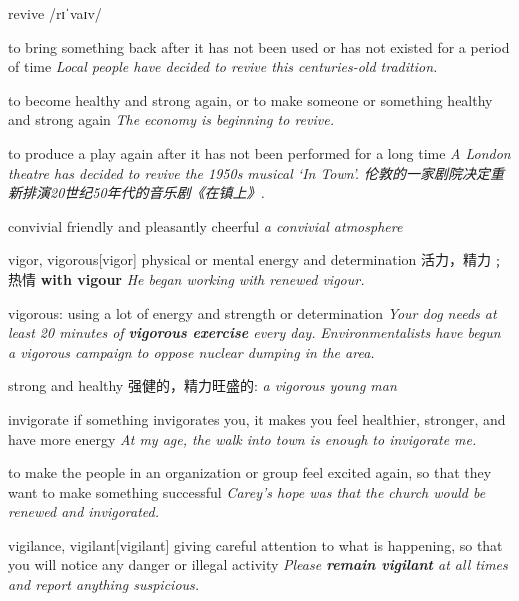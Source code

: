 \begin{DefWord}{revive}
    /rɪˈvaɪv/

    to bring something back after it has not been used or has not existed for a period of time
    \textit{Local people have decided to revive this centuries-old tradition.}

    to become healthy and strong again, or to make someone or something healthy and strong again
    \textit{The economy is beginning to revive.}

    to produce a play again after it has not been performed for a long time
    \textit{A London theatre has decided to revive the 1950s musical ‘In Town’. 伦敦的一家剧院决定重新排演20世纪50年代的音乐剧《在镇上》. }
\end{DefWord}

\begin{DefWord}{convivial}
    friendly and pleasantly cheerful
    \textit{a convivial atmosphere}
\end{DefWord}

\begin{DefWord}{vigor, vigorous}[vigor]
    physical or mental energy and determination 活力，精力﹔热情
    \textbf{with vigour}
    \textit{He began working with renewed vigour.}

    vigorous: using a lot of energy and strength or determination
    \textit{Your dog needs at least 20 minutes of \textbf{vigorous exercise} every day.}
    \textit{Environmentalists have begun a vigorous campaign to oppose nuclear dumping in the area.}

    strong and healthy 强健的，精力旺盛的:
    \textit{a vigorous young man}
\end{DefWord}

\begin{DefWord}{invigorate}
    if something invigorates you, it makes you feel healthier, stronger, and have more energy
    \textit{At my age, the walk into town is enough to invigorate me.}

    to make the people in an organization or group feel excited again, so that they want to make something successful
    \textit{Carey’s hope was that the church would be renewed and invigorated.}
\end{DefWord}

\begin{DefWord}{vigilance, vigilant}[vigilant]
    giving careful attention to what is happening, so that you will notice any danger or illegal activity
    \textit{Please \textbf{remain vigilant} at all times and report anything suspicious.}
\end{DefWord}

